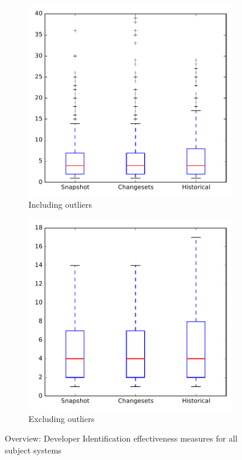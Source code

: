
\begin{figure}
    \centering
    \begin{subfigure}{.4\textwidth}
        \centering
        \includegraphics[height=0.4\textheight]{figures/dit/all_overview}
        \caption{Including outliers}\label{fig:dit:all:overview_outlier}
    \end{subfigure}%
    \begin{subfigure}{.4\textwidth}
        \centering
        \includegraphics[height=0.4\textheight]{figures/dit/all_overview_no_outlier}
        \caption{Excluding outliers}\label{fig:dit:all:overview_no_outlier}
    \end{subfigure}
\caption{Overview: Developer Identification effectiveness measures for all subject systems}
\label{fig:dit:all:overview}
\end{figure}
